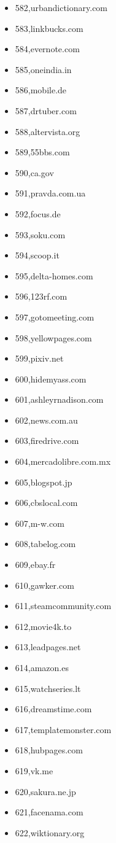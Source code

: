 \begin{multicols}{3}
\begin{itemize}
	\item 582,urbandictionary.com
	\item 583,linkbucks.com
	\item 584,evernote.com
	\item 585,oneindia.in
	\item 586,mobile.de
	\item 587,drtuber.com
	\item 588,altervista.org
	\item 589,55bbs.com
	\item 590,ca.gov
	\item 591,pravda.com.ua
	\item 592,focus.de
	\item 593,soku.com
	\item 594,scoop.it
	\item 595,delta-homes.com
	\item 596,123rf.com
	\item 597,gotomeeting.com
	\item 598,yellowpages.com
	\item 599,pixiv.net
	\item 600,hidemyass.com
	\item 601,ashleyrnadison.com
	\item 602,news.com.au
	\item 603,firedrive.com
	\item 604,mercadolibre.com.mx
	\item 605,blogspot.jp
	\item 606,cbslocal.com
	\item 607,m-w.com
	\item 608,tabelog.com
	\item 609,ebay.fr
	\item 610,gawker.com
	\item 611,steamcommunity.com
	\item 612,movie4k.to
	\item 613,leadpages.net
	\item 614,amazon.es
	\item 615,watchseries.lt
	\item 616,dreamstime.com
	\item 617,templatemonster.com
	\item 618,hubpages.com
	\item 619,vk.me
	\item 620,sakura.ne.jp
	\item 621,facenama.com
	\item 622,wiktionary.org

\end{itemize}
\end{multicols}
